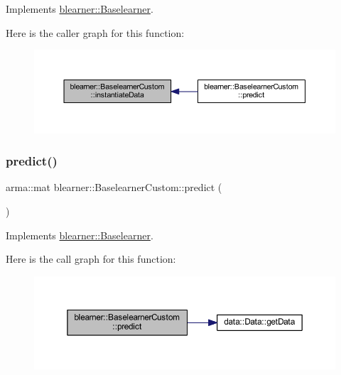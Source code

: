 Implements \mbox{\hyperlink{classblearner_1_1_baselearner_af01f1b8c4540927705ff79c3649489f7}{blearner\+::\+Baselearner}}.

Here is the caller graph for this function\+:\nopagebreak
\begin{figure}[H]
\begin{center}
\leavevmode
\includegraphics[width=350pt]{classblearner_1_1_baselearner_custom_a83c25e681bb606ae4a36c249a36229b9_icgraph}
\end{center}
\end{figure}
\mbox{\label{classblearner_1_1_baselearner_custom_a7d9640dbb9a118b77735cf79a5850652}} 
\subsubsection{\texorpdfstring{predict()}{predict()}\hspace{0.1cm}{\footnotesize\ttfamily [1/2]}}
{\footnotesize\ttfamily arma\+::mat blearner\+::\+Baselearner\+Custom\+::predict (\begin{DoxyParamCaption}{ }\end{DoxyParamCaption})\hspace{0.3cm}{\ttfamily [virtual]}}



Implements \mbox{\hyperlink{classblearner_1_1_baselearner_ab37986047db43c84420fef2cef7fc20d}{blearner\+::\+Baselearner}}.

Here is the call graph for this function\+:\nopagebreak
\begin{figure}[H]
\begin{center}
\leavevmode
\includegraphics[width=350pt]{classblearner_1_1_baselearner_custom_a7d9640dbb9a118b77735cf79a5850652_cgraph}
\end{center}
\end{figure}
\mbox{\label{classblearner_1_1_baselearner_custom_aeeb3a3934b94f095bfe689cff385dfa7}} 
